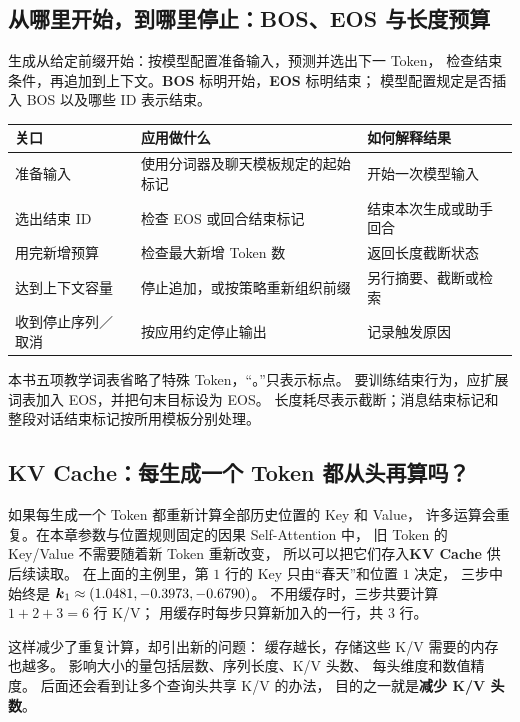 \subsection{从哪里开始，到哪里停止：BOS、EOS 与长度预算}
\label{concept:bos-eos}
生成从给定前缀开始：按模型配置准备输入，预测并选出下一 Token，
检查结束条件，再追加到上下文。\textbf{BOS} 标明开始，\textbf{EOS} 标明结束；
模型配置规定是否插入 BOS 以及哪些 ID 表示结束。

\begin{center}\small
{}
\begin{tabularx}{\linewidth}{@{}p{32mm}XX@{}}
\toprule
关口 & 应用做什么 & 如何解释结果\\\midrule
准备输入 & 使用分词器及聊天模板规定的起始标记 & 开始一次模型输入\\
选出结束 ID & 检查 EOS 或回合结束标记 & 结束本次生成或助手回合\\
用完新增预算 & 检查最大新增 Token 数 & 返回长度截断状态\\
达到上下文容量 & 停止追加，或按策略重新组织前缀 & 另行摘要、截断或检索\\
收到停止序列／取消 & 按应用约定停止输出 & 记录触发原因\\
\bottomrule
\end{tabularx}
\end{center}
\begin{boundarybox}
本书五项教学词表省略了特殊 Token，“。”只表示标点。
要训练结束行为，应扩展词表加入 EOS，并把句末目标设为 EOS。
长度耗尽表示截断；消息结束标记和整段对话结束标记按所用模板分别处理。
\end{boundarybox}

\subsection{KV Cache：每生成一个 Token 都从头再算吗？}
\label{concept:kv-cache}

如果每生成一个 Token 都重新计算全部历史位置的 Key 和 Value，
许多运算会重复。在本章参数与位置规则固定的因果 Self-Attention 中，
旧 Token 的 Key/Value 不需要随着新 Token 重新改变，
所以可以把它们存入\textbf{KV Cache} 供后续读取。
在上面的主例里，第 $1$ 行的 Key 只由“春天”和位置 $1$ 决定，
三步中始终是 $\boldsymbol{k}_1\approx(1.0481,-0.3973,-0.6790)$。
不用缓存时，三步共要计算 $1+2+3=6$ 行 K/V；
用缓存时每步只算新加入的一行，共 $3$ 行。

这样减少了重复计算，却引出新的问题：
缓存越长，存储这些 K/V 需要的内存也越多。
影响大小的量包括层数、序列长度、K/V 头数、
每头维度和数值精度。
后面还会看到让多个查询头共享 K/V 的办法，
目的之一就是\textbf{减少 K/V 头数}。

